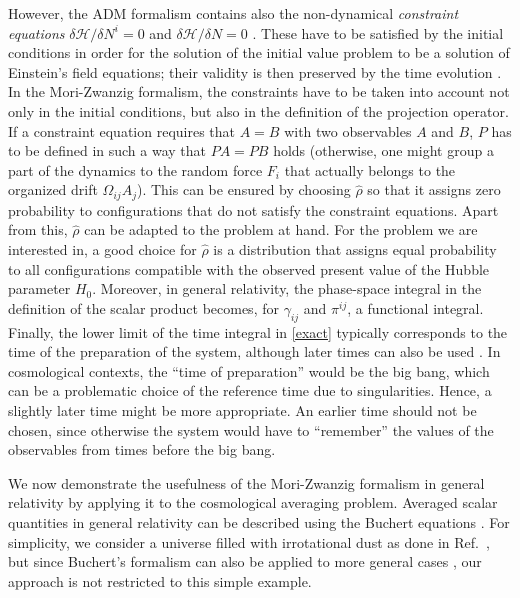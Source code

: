 \documentclass[aps,prl,11pt,nofootinbib]{revtex4-1}
\newcommand{\ZT}[1]{\textquotedblleft#1\textquotedblright}%
\begin{document}
However, the {ADM} formalism contains also the non-dynamical \textit{constraint equations} $\delta \mathcal{H}/\delta N^i=0$ and $\delta \mathcal{H}/\delta N = 0$ \cite{Gourgoulhon2007}. These have to be satisfied by the initial conditions in order for the solution of the initial value problem to be a solution of Einstein's field equations; their validity is then preserved by the time evolution \cite{Gourgoulhon2007,Lehner2001}. In the Mori-Zwanzig formalism, the constraints have to be taken into account not only in the initial conditions, but also in the definition of the projection operator. If a constraint equation requires that $A=B$ with two observables $A$ and $B$, $P$ has to be defined in such a way that $PA=PB$ holds (otherwise, one might group a part of the dynamics to the random force $F_i$ that actually belongs to the organized drift $\Omega_{ij}A_j$). This can be ensured by choosing $\hat{\rho}$ so that it assigns zero probability to configurations that do not satisfy the constraint equations. Apart from this, $\hat{\rho}$ can be adapted to the problem at hand. For the problem we are interested in, a good choice for $\hat{\rho}$ is a distribution that assigns equal probability to all configurations compatible with the observed present value of the Hubble parameter $H_0$. Moreover, in general relativity, the phase-space integral in the definition of the  scalar  product becomes, for $\gamma_{ij}$ and $\pi^{ij}$, a functional integral. Finally, the lower limit of the time integral in \cref{exact} typically corresponds to the time of the preparation of the system, although later times can also be used \cite{Grabert1978}. In cosmological contexts, the \ZT{time of preparation} would be the big bang, which can be a problematic choice of the reference time due to singularities. Hence, a slightly later time might be more appropriate. An earlier time should not be chosen, since otherwise the system would have to \ZT{remember} the values of the observables from times before the big bang. 

We now demonstrate the usefulness of the Mori-Zwanzig formalism in general relativity by applying it to the cosmological averaging problem. Averaged scalar quantities in general relativity can be described using the Buchert equations \cite{Buchert2000,Buchert2001,BuchertMR2020}. For simplicity, we consider a universe filled with irrotational dust as done in Ref.\ \cite{Buchert2000}, but since Buchert's formalism can also be applied to more general cases \cite{BuchertMR2020}, our approach is not restricted to this simple example.
\end{document}
